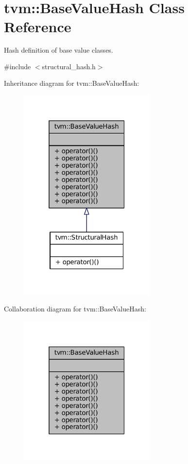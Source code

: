 \hypertarget{classtvm_1_1BaseValueHash}{}\section{tvm\+:\+:Base\+Value\+Hash Class Reference}
\label{classtvm_1_1BaseValueHash}


Hash definition of base value classes.  




{\ttfamily \#include $<$structural\+\_\+hash.\+h$>$}



Inheritance diagram for tvm\+:\+:Base\+Value\+Hash\+:
\nopagebreak
\begin{figure}[H]
\begin{center}
\leavevmode
\includegraphics[width=196pt]{classtvm_1_1BaseValueHash__inherit__graph}
\end{center}
\end{figure}


Collaboration diagram for tvm\+:\+:Base\+Value\+Hash\+:
\nopagebreak
\begin{figure}[H]
\begin{center}
\leavevmode
\includegraphics[width=196pt]{classtvm_1_1BaseValueHash__coll__graph}
\end{center}
\end{figure}
